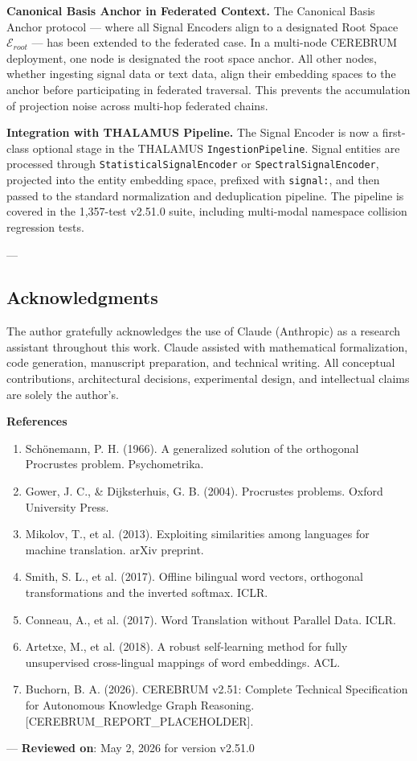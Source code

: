 \textbf{Canonical Basis Anchor in Federated Context.} The Canonical Basis Anchor protocol — where all Signal Encoders align to a designated Root Space $\mathcal{E}_{root}$ — has been extended to the federated case. In a multi-node CEREBRUM deployment, one node is designated the root space anchor. All other nodes, whether ingesting signal data or text data, align their embedding spaces to the anchor before parti\-cipating in federated traversal. This prevents the accum\-ulation of projection noise across multi-hop federated chains.

\textbf{Integration with THALAMUS Pipeline.} The Signal Encoder is now a first-class optional stage in the THALAMUS \texttt{IngestionPipeline}. Signal entities are processed through \texttt{StatisticalSignalEncoder} or \texttt{SpectralSignalEncoder}, projected into the entity embedding space, prefixed with \texttt{signal:}, and then passed to the standard norma\-lization and dedup\-lication pipeline. The pipeline is covered in the 1,357-test v2.51.0 suite, including multi-modal namespace collision regression tests.

---
\subsection{Acknow\-ledgments}

The author gratefully ackno\-wledges the use of Claude (Anthropic) as a research assistant throughout this work. Claude assisted with mathe\-matical forma\-lization, code generation, manuscript preparation, and technical writing. All conceptual contr\-ibutions, archi\-tectural decisions, exper\-imental design, and intel\-lectual claims are solely the author's.

\textbf{References}
\begin{enumerate}
\item Schönemann, P. H. (1966). A generalized solution of the orthogonal Procrustes problem. Psycho\-metrika.
\item Gower, J. C., \& Dijkst\-erhuis, G. B. (2004). Procrustes problems. Oxford University Press.
\item Mikolov, T., et al. (2013). Exploiting simil\-arities among languages for machine translation. arXiv preprint.
\item Smith, S. L., et al. (2017). Offline bilingual word vectors, orthogonal trans\-formations and the inverted softmax. ICLR.
\item Conneau, A., et al. (2017). Word Translation without Parallel Data. ICLR.
\item Artetxe, M., et al. (2018). A robust self-learning method for fully unsup\-ervised cross-lingual mappings of word embeddings. ACL.
\item Buchorn, B. A. (2026). CEREBRUM v2.51: Complete Technical Specif\-ication for Autonomous Knowledge Graph Reasoning. [CEREBRUM\_REPORT\_PLACEHOLDER].

\end{enumerate}
---
\textbf{Reviewed on}: May 2, 2026 for version v2.51.0
